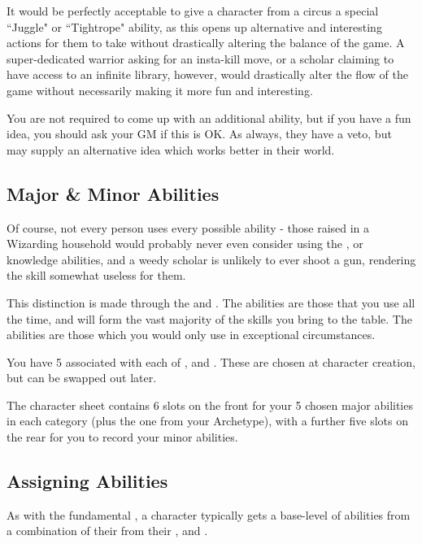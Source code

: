 It would be perfectly acceptable to give a character from a circus a special ``Juggle" or ``Tightrope" ability, as this opens up alternative and interesting actions for them to take without drastically altering the balance of the game. A super-dedicated warrior asking for an insta-kill move, or a scholar claiming to have access to an infinite library, however, would drastically alter the flow of the game without necessarily making it more fun and interesting. 

You are not required to come up with an additional ability, but if you have a fun idea, you should ask your GM if this is OK. As always, they have a veto, but may supply an alternative idea which works better in their world. 


\subsection{Major \& Minor Abilities}

Of course, not every person uses every possible ability - those raised in a Wizarding household would probably never even consider using the , or  knowledge abilities, and a weedy scholar is unlikely to ever shoot a gun, rendering the  skill somewhat useless for them. 

This distinction is made through the  and . The  abilities are those that you use all the time, and will form the vast majority of the skills you bring to the table. The  abilities are those which you would only use in exceptional circumstances. 

You have 5  associated with each of ,  and . These are chosen at character creation, but can be swapped out later. 

The character sheet contains 6 slots on the front for your 5 chosen major abilities in each category (plus the one from your Archetype), with a further five slots on the rear for you to record your minor abilities. 


\subsection{Assigning Abilities}


As with the fundamental , a character typically gets a base-level of abilities from a combination of their  from their ,  and .

